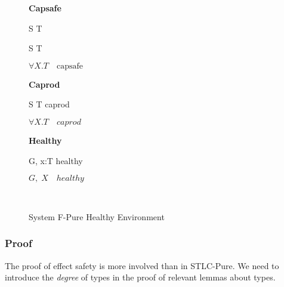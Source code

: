 \begin{figure}[h]
\begin{framed}

\setlength{\columnseprule}{0.4pt}
\begin{multicols}{2}

\textbf{Capsafe}


{ S \to T \quad {} }

{ S \to T \quad {} }

{ \colorbox{shade}{$\forall X.T \quad \text{capsafe}$} }

\columnbreak

\textbf{Caprod}


{ S \to T \quad caprod }

{ \colorbox{shade}{$\forall X.T \quad caprod$} }

\textbf{Healthy}


{ G, \; x:T \quad healthy }

{ \colorbox{shade}{$G, \; X \quad healthy$} }

\hfill\\

\end{multicols}
\end{framed}

\caption{System F-Pure Healthy Environment}
\label{fig:f-pure-healthy-definition}
\end{figure}


\subsubsection{Proof}

The proof of effect safety is more involved than in STLC-Pure. We need
to introduce the \emph{degree} of types in the proof of
relevant lemmas about types.

